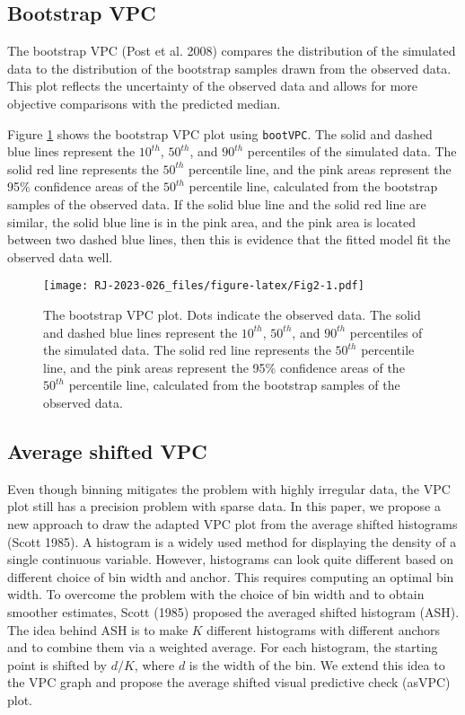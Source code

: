 \hypertarget{bootstrap-vpc}{%
\subsection{Bootstrap VPC}\label{bootstrap-vpc}}

The bootstrap VPC (Post et al. 2008) compares the distribution of the simulated data to the distribution of the bootstrap samples drawn from the observed data.
This plot reflects the uncertainty of the observed data and allows for more objective comparisons with the predicted median.

Figure \ref{fig:Fig2} shows the bootstrap VPC plot using \texttt{bootVPC}. The solid and dashed blue lines represent the \(10^{th}\), \(50^{th}\), and \(90^{th}\) percentiles of the simulated data. The solid red line represents the \(50^{th}\) percentile line, and the pink areas represent the 95\(\%\) confidence areas of the \(50^{th}\) percentile line, calculated from the bootstrap samples of the observed data. If the solid blue line and the solid red line are similar, the solid blue line is in the pink area, and the pink area is located between two dashed blue lines,
then this is evidence that the fitted model fit the observed data well.

\begin{figure}
\centering
\texttt{[image: RJ-2023-026\_files/figure-latex/Fig2-1.pdf]}
\caption{\label{fig:Fig2}The bootstrap VPC plot. Dots indicate the observed data. The solid and dashed blue lines represent the \(10^{th}\), \(50^{th}\), and \(90^{th}\) percentiles of the simulated data. The solid red line represents the \(50^{th}\) percentile line, and the pink areas represent the 95\% confidence areas of the \(50^{th}\) percentile line, calculated from the bootstrap samples of the observed data.}
\end{figure}

\hypertarget{average-shifted-vpc}{%
\subsection{Average shifted VPC}\label{average-shifted-vpc}}

Even though binning mitigates the problem with highly irregular data, the VPC plot still has a precision problem with sparse data. In this paper, we propose a new approach to draw the adapted VPC plot from the average shifted histograms (Scott 1985).
A histogram is a widely used method for displaying the density of a single continuous variable. However, histograms can look quite different based on different choice of bin width and anchor.
This requires computing an optimal bin width.
To overcome the problem with the choice of bin width and to obtain smoother estimates, Scott (1985) proposed the averaged shifted histogram (ASH). The idea behind ASH is to make \(K\) different histograms with different anchors and to combine them via a weighted average. For each histogram, the starting point is shifted by \(d/K\), where \(d\) is the width of the bin. We extend this idea to the VPC graph and propose the average shifted visual predictive check (asVPC) plot.

